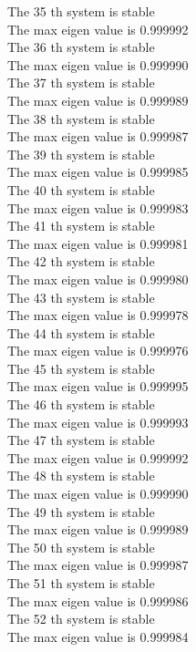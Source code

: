 \documentclass[11pt]{article}
\begin{document}
The 35 th system is stable \\
The max eigen value is 0.999992 \\
The 36 th system is stable \\
The max eigen value is 0.999990 \\
The 37 th system is stable \\
The max eigen value is 0.999989 \\
The 38 th system is stable \\
The max eigen value is 0.999987 \\
The 39 th system is stable \\
The max eigen value is 0.999985 \\
The 40 th system is stable \\
The max eigen value is 0.999983 \\
The 41 th system is stable \\
The max eigen value is 0.999981 \\
The 42 th system is stable \\
The max eigen value is 0.999980 \\
The 43 th system is stable \\
The max eigen value is 0.999978 \\
The 44 th system is stable \\
The max eigen value is 0.999976 \\
The 45 th system is stable \\
The max eigen value is 0.999995 \\
The 46 th system is stable \\
The max eigen value is 0.999993 \\
The 47 th system is stable \\
The max eigen value is 0.999992 \\
The 48 th system is stable \\
The max eigen value is 0.999990 \\
The 49 th system is stable \\
The max eigen value is 0.999989 \\
The 50 th system is stable \\
The max eigen value is 0.999987 \\
The 51 th system is stable \\
The max eigen value is 0.999986 \\
The 52 th system is stable \\
The max eigen value is 0.999984 \\
\end{document}
